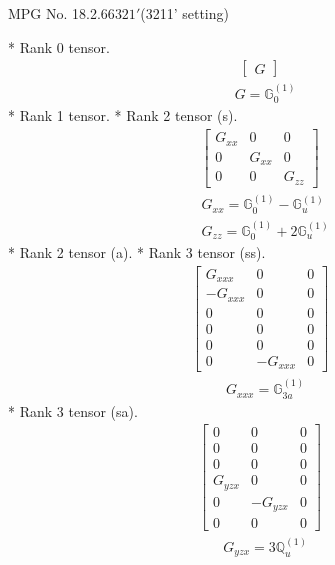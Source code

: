 \documentclass[fleqn,8pt,landscape]{jsarticle}
\begin{document}
\setcounter{MaxMatrixCols}{32}

\renewcommand{\tablename}{Table~}
\renewcommand{\figurename}{Figure~}
\begin{center}
\LARGE
MPG No. 18.2.66\quad$321'$\quad(3211' setting)
\end{center}
* Rank 0 tensor.
\begin{align*}
\begin{bmatrix} G \end{bmatrix}
\end{align*}
\begin{align*}
& G = \mathbb{G}_{0}^{(1)}
\end{align*}
* Rank 1 tensor.
* Rank 2 tensor (s).
\begin{align*}
\begin{bmatrix} G_{xx} & 0 & 0 \\ 0 & G_{xx} & 0 \\ 0 & 0 & G_{zz} \end{bmatrix}
\end{align*}
\begin{align*}
& G_{xx} = \mathbb{G}_{0}^{(1)} - \mathbb{G}_{u}^{(1)} \\
& G_{zz} = \mathbb{G}_{0}^{(1)} + 2 \mathbb{G}_{u}^{(1)}
\end{align*}
* Rank 2 tensor (a).
* Rank 3 tensor (ss).
\begin{align*}
\begin{bmatrix} G_{xxx} & 0 & 0 \\ - G_{xxx} & 0 & 0 \\ 0 & 0 & 0 \\ 0 & 0 & 0 \\ 0 & 0 & 0 \\ 0 & - G_{xxx} & 0 \end{bmatrix}
\end{align*}
\begin{align*}
& G_{xxx} = \mathbb{G}_{3a}^{(1)}
\end{align*}
* Rank 3 tensor (sa).
\begin{align*}
\begin{bmatrix} 0 & 0 & 0 \\ 0 & 0 & 0 \\ 0 & 0 & 0 \\ G_{yzx} & 0 & 0 \\ 0 & - G_{yzx} & 0 \\ 0 & 0 & 0 \end{bmatrix}
\end{align*}
\begin{align*}
& G_{yzx} = 3 \mathbb{Q}_{u}^{(1)}
\end{align*}
\end{document}
